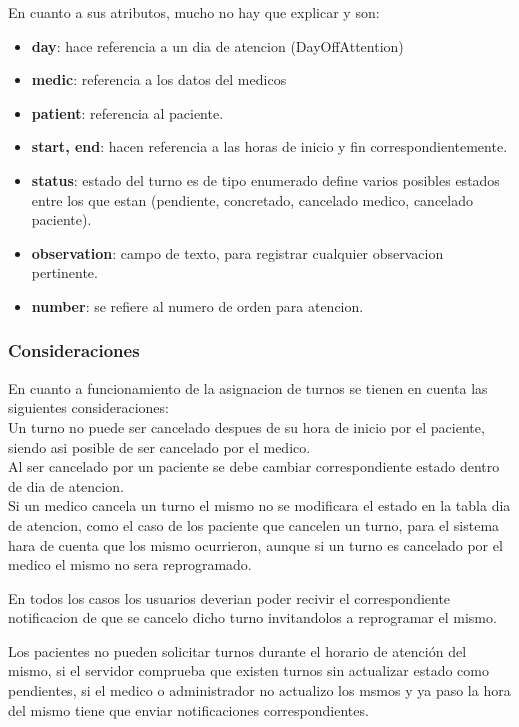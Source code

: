 En cuanto a sus atributos, mucho no hay que explicar y son:

\begin{itemize}
    \item \textbf{day}: hace referencia a un dia de atencion (DayOffAttention)
    \item \textbf{medic}: referencia a los datos del medicos
    \item \textbf{patient}: referencia al paciente. 
    \item \textbf{start, end}: hacen referencia a las horas de inicio y fin 
        correspondientemente.
    \item \textbf{status}: estado del turno es de tipo enumerado define varios 
        posibles estados entre los que estan (pendiente, concretado, cancelado 
        medico, cancelado paciente).
    \item \textbf{observation}: campo de texto, para registrar cualquier 
        observacion pertinente.
    \item \textbf{number}: se refiere al numero de orden para atencion.
\end{itemize}

\subsubsection{Consideraciones}

En cuanto a funcionamiento de la asignacion de turnos se tienen en cuenta las
siguientes consideraciones: \\[0.1cm]

Un turno no puede ser cancelado despues de su hora de inicio por el paciente, 
siendo asi posible de ser cancelado por el medico. \\[0.1cm]

Al ser cancelado por un paciente se debe cambiar correspondiente estado dentro 
de dia de atencion. \\[0.1cm]

 Si un medico cancela un turno el mismo no se modificara el estado en la tabla 
 dia de atencion, como el caso de los paciente que cancelen un turno, 
 para el sistema hara de cuenta que los mismo ocurrieron, aunque si un turno es 
 cancelado por el medico el mismo no sera reprogramado.

 En todos los casos los usuarios deverian poder recivir el correspondiente 
 notificacion de que se cancelo dicho turno invitandolos a reprogramar el mismo.

Los pacientes no pueden solicitar turnos durante el horario de atenci\'on del 
mismo, si el servidor comprueba que existen turnos sin actualizar estado como 
pendientes, si el medico o administrador no actualizo los msmos y ya paso la 
hora del mismo tiene que enviar notificaciones correspondientes. 



